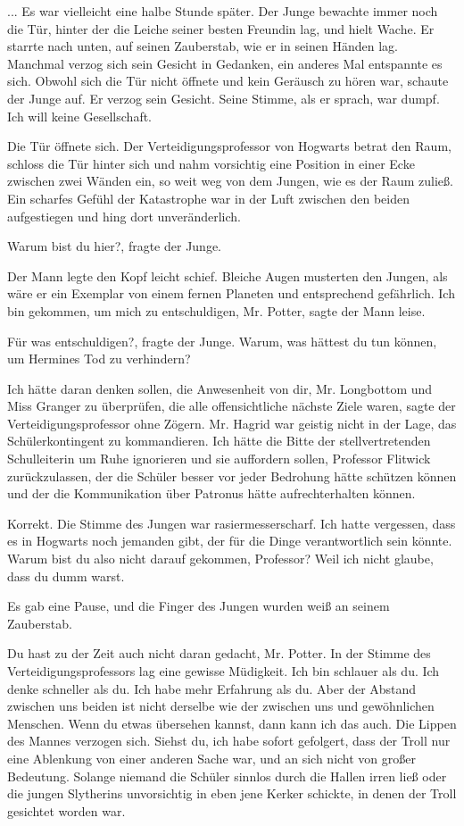 ... Es war vielleicht eine halbe Stunde später. Der Junge bewachte immer noch
die Tür, hinter der die Leiche seiner besten Freundin lag, und hielt Wache. Er
starrte nach unten, auf seinen Zauberstab, wie er in seinen Händen lag. Manchmal
verzog sich sein Gesicht in Gedanken, ein anderes Mal entspannte es sich. Obwohl
sich die Tür nicht öffnete und kein Geräusch zu hören war, schaute der Junge
auf. Er verzog sein Gesicht. Seine Stimme, als er sprach, war dumpf. \glqq Ich
will keine Gesellschaft.\grqq{}

Die Tür öffnete sich. Der Verteidigungsprofessor von Hogwarts betrat den Raum,
schloss die Tür hinter sich und nahm vorsichtig eine Position in einer Ecke
zwischen zwei Wänden ein, so weit weg von dem Jungen, wie es der Raum zuließ.
Ein scharfes Gefühl der Katastrophe war in der Luft zwischen den beiden
aufgestiegen und hing dort unveränderlich.

\glqq Warum bist du hier?\grqq{}, fragte der Junge.

Der Mann legte den Kopf leicht schief. Bleiche Augen musterten den Jungen, als
wäre er ein Exemplar von einem fernen Planeten und entsprechend gefährlich.
\glqq Ich bin gekommen, um mich zu entschuldigen, Mr. Potter\grqq{}, sagte der
Mann leise.

\glqq Für was entschuldigen?\grqq{}, fragte der Junge. \glqq Warum, was hättest
du tun können, um Hermines Tod zu verhindern?\grqq{}

\glqq Ich hätte daran denken sollen, die Anwesenheit von dir, Mr. Longbottom und
Miss Granger zu überprüfen, die alle offensichtliche nächste Ziele waren\grqq{},
sagte der Verteidigungsprofessor ohne Zögern. \glqq Mr. Hagrid war geistig nicht
in der Lage, das Schülerkontingent zu kommandieren. Ich hätte die Bitte der
stellvertretenden Schulleiterin um Ruhe ignorieren und sie auffordern sollen,
Professor Flitwick zurückzulassen, der die Schüler besser vor jeder Bedrohung
hätte schützen können und der die Kommunikation über Patronus hätte
aufrechterhalten können.\grqq{}

\glqq Korrekt.\grqq{} Die Stimme des Jungen war rasiermesserscharf. \glqq Ich
hatte vergessen, dass es in Hogwarts noch jemanden gibt, der für die Dinge
verantwortlich sein könnte. Warum bist du also nicht darauf gekommen, Professor?
Weil ich nicht glaube, dass du dumm warst.\grqq{}

Es gab eine Pause, und die Finger des Jungen wurden weiß an seinem Zauberstab.

\glqq Du hast zu der Zeit auch nicht daran gedacht, Mr. Potter.\grqq{} In der
Stimme des Verteidigungsprofessors lag eine gewisse Müdigkeit. \glqq Ich bin
schlauer als du. Ich denke schneller als du. Ich habe mehr Erfahrung als du.
Aber der Abstand zwischen uns beiden ist nicht derselbe wie der zwischen uns und
gewöhnlichen Menschen. Wenn du etwas übersehen kannst, dann kann ich das
auch.\grqq{} Die Lippen des Mannes verzogen sich. \glqq Siehst du, ich habe
sofort gefolgert, dass der Troll nur eine Ablenkung von einer anderen Sache war,
und an sich nicht von großer Bedeutung. Solange niemand die Schüler sinnlos
durch die Hallen irren ließ oder die jungen Slytherins unvorsichtig in eben jene
Kerker schickte, in denen der Troll gesichtet worden war.\grqq{}

